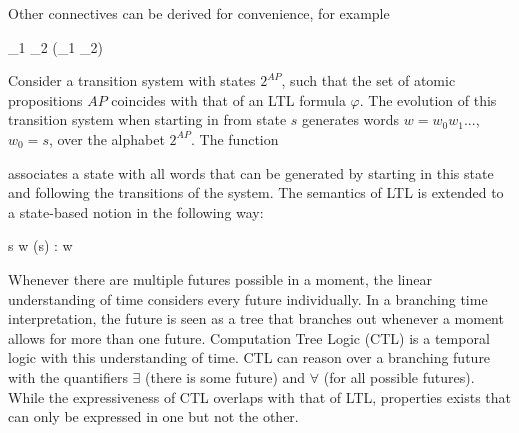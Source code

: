     Other connectives can be derived for convenience, for example

    \startformula
        \startalign[n=3,align={right,left,middle}]
            \NC \varphi_1 \vee \varphi_2
            \NC \colonequals \neg(\neg \varphi_1 \wedge \neg \varphi_2) ~~~
            \NC {}
            \NR
            \NC \Finally \varphi
            \NC \colonequals \True \,\Until\, \varphi
            \NC {}
            \NR
            \NC \Globally \varphi
            \NC \colonequals \neg \Finally \neg \varphi
            \NC {}
            \NR
        \stopalign
    \stopformula

    Consider a transition system with states $2^{AP}$, such that the set of atomic propositions $AP$ coincides with that of an LTL formula $\varphi$.
    The evolution of this transition system when starting in from state $s$ generates words $w = w_0 w_1 ...$, $w_0 = s$, over the alphabet $2^{AP}$.
    The function
    
    \startformula
    \stopformula

    associates a state with all words that can be generated by starting in this state and following the transitions of the system.
    The semantics of LTL is extended to a state-based notion in the following way:

    \startformula
        s \vDash \varphi \iff \forall w (s) : w \vDash \varphi \EndPeriod
    \stopformula

\stopsubsection


\startsubsection[title={Other Temporal Logics},reference=sec:theory-logic-other]

    Whenever there are multiple futures possible in a moment, the linear understanding of time considers every future individually.
    In a branching time interpretation, the future is seen as a tree that branches out whenever a moment allows for more than one future.
    Computation Tree Logic (CTL) is a temporal logic with this understanding of time.
    CTL can reason over a branching future with the quantifiers $\exists$ (there is some future) and $\forall$ (for all possible futures).
    While the expressiveness of CTL overlaps with that of LTL, properties exists that can only be expressed in one but not the other.

